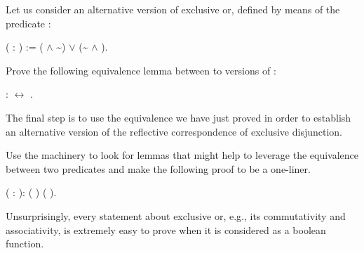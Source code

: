 \begin{exercise}


Let us consider an alternative version of exclusive or, defined by
means of the predicate :


\begin{coqdoccode}
\coqdocemptyline
\coqdocnoindent
{}  ( : ) := ( \ensuremath{\land} \textasciitilde{}) \ensuremath{\lor} (\~{} \ensuremath{\land} ).\coqdoceol
\end{coqdoccode}


\noindent


Prove the following equivalence lemma between to versions of :


\begin{coqdoccode}
\coqdocemptyline
\coqdocnoindent
{}   :    \ensuremath{\leftrightarrow}   .\coqdoceol
\coqdocemptyline
\end{coqdoccode}


\noindent
The final step is to use the equivalence we have just proved in order
to establish an alternative version of the reflective correspondence
of exclusive disjunction.


\hint Use the  machinery to look for lemmas that might help
 to leverage the equivalence between two predicates and make the
 following proof to be a one-liner.


\begin{coqdoccode}
\coqdocemptyline
\coqdocnoindent
{}  (  : ):  (  ) (  ).\coqdoceol
\coqdocemptyline
\end{coqdoccode}


\end{exercise}


Unsurprisingly, every statement about exclusive or, e.g., its
commutativity and associativity, is extremely easy to prove when it is
considered as a boolean function. 


